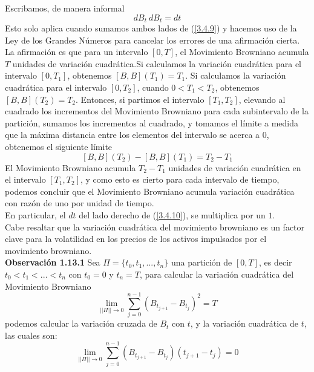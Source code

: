 \documentclass[11pt,notitlepage]{article}
\begin{document}
Escribamos, de manera informal 
\begin{equation} \label{3.4.10}
    dB_t~dB_t= dt
\end{equation}
Esto solo aplica cuando sumamos ambos lados de (\ref{3.4.9}) y hacemos uso de la Ley de los Grandes Números para cancelar los errores de una afirmación cierta. La afirmación es que para un intervalo \([0,T]\), el Movimiento Browniano acumula \(T\) unidades de variación cuadrática.Si calculamos la variación cuadrática para el intervalo \([0,T_1]\), obtenemos \([B,B](T_1)=T_1\). Si calculamos la variación cuadrática para el intervalo \([0,T_2]\), cuando \(0 <T_1<T_2\), obtenemos \([B,B](T_2)=T_2\). Entonces, si partimos el intervalo \([T_1,T_2]\), elevando al cuadrado los incrementos del Movimiento Browniano para cada subintervalo de la partición, sumamos los incrementos al cuadrado, y tomamos el límite a medida que la máxima distancia entre los elementos del intervalo se acerca a \(0\), obtenemos el siguiente límite
\[[B,B](T_2)-[B,B](T_1)= T_2-T_1\]
El Movimiento Browniano acumula \(T_2-T_1\) unidades de variación cuadrática en el intervalo \([T_1,T_2]\), y como esto es cierto para cada intervalo de tiempo, podemos concluir que el Movimiento Browniano acumula variación cuadrática con razón de uno por unidad de tiempo.\\

En particular, el \(dt\) del lado derecho de (\ref{3.4.10}), se multiplica por un \(1\).\\

Cabe resaltar que la variación cuadrática del movimiento browniano es un factor clave para la volatilidad en los precios de los activos impulsados por el movimiento browniano.\\

\textbf{Observación 1.13.1} Sea \(\Pi=\{t_0,t_1,...,t_n\}\) una partición de \([0,T]\), es decir \(t_0<t_1<...<t_n\) con \(t_0=0\) y \(t_n=T\), para calcular la variación cuadrática del Movimiento Browniano 
\begin{equation} \label{3.4.11}
    \lim_{||\Pi|| \to 0} \sum_{j=0}^{n-1}(B_{t_{j+1}}-B_{t_j})^2=T
\end{equation}
podemos calcular la variación cruzada de \(B_t\) con \(t\), y la variación cuadrática de \(t\), las cuales son:
\begin{equation} \label{3.4.12}
    \lim_{||\Pi|| \to 0} \sum_{j=0}^{n-1}(B_{t_{j+1}}-B_{t_j})(t_{j+1}-t_j)=0
\end{equation}
\end{document}
